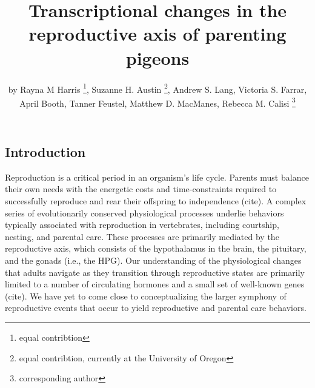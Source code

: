 \title{Transcriptional changes in the reproductive axis of parenting pigeons}
\author{by Rayna M Harris \footnote{equal contribtion}, Suzanne H. Austin \footnote{equal contribtion, currently at the
  University of Oregon}, Andrew S. Lang, Victoria S. Farrar, April Booth, Tanner Feustel, Matthew D. MacManes, Rebecca M. Calisi \footnote{corresponding author}}

\maketitle



\hypertarget{introduction}{%
\subsection{Introduction}\label{introduction}}

Reproduction is a critical period in an organism's life cycle. Parents
must balance their own needs with the energetic costs and
time-constraints required to successfully reproduce and rear their
offspring to independence (cite). A complex series of evolutionarily
conserved physiological processes underlie behaviors typically
associated with reproduction in vertebrates, including courtship,
nesting, and parental care. These processes are primarily mediated by
the reproductive axis, which consists of the hypothalamus in the brain,
the pituitary, and the gonads (i.e., the HPG). Our understanding of the
physiological changes that adults navigate as they transition through
reproductive states are primarily limited to a number of circulating
hormones and a small set of well-known genes (cite). We have yet to come
close to conceptualizing the larger symphony of reproductive events that
occur to yield reproductive and parental care behaviors.

